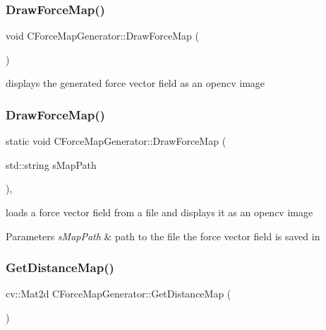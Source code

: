 \subsubsection{\texorpdfstring{Draw\+Force\+Map()}{DrawForceMap()}\hspace{0.1cm}{\footnotesize\ttfamily [1/2]}}
{\footnotesize\ttfamily void C\+Force\+Map\+Generator\+::\+Draw\+Force\+Map (\begin{DoxyParamCaption}{ }\end{DoxyParamCaption})\hspace{0.3cm}{\ttfamily [inline]}}

displays the generated force vector field as an opencv image \mbox{\label{classCForceMapGenerator_ab05430eb97cf83da00b1116877a37c36}} 
\subsubsection{\texorpdfstring{Draw\+Force\+Map()}{DrawForceMap()}\hspace{0.1cm}{\footnotesize\ttfamily [2/2]}}
{\footnotesize\ttfamily static void C\+Force\+Map\+Generator\+::\+Draw\+Force\+Map (\begin{DoxyParamCaption}\item[{std\+::string}]{s\+Map\+Path }\end{DoxyParamCaption})\hspace{0.3cm}{\ttfamily [inline]}, {\ttfamily [static]}}

loads a force vector field from a file and displays it as an opencv image 
\begin{DoxyParams}{Parameters}
{\em s\+Map\+Path} & path to the file the force vector field is saved in \\
\hline
\end{DoxyParams}
\mbox{\label{classCForceMapGenerator_afdd89858af3158b17170960df126a7df}} 
\subsubsection{\texorpdfstring{Get\+Distance\+Map()}{GetDistanceMap()}}
{\footnotesize\ttfamily cv\+::\+Mat2d C\+Force\+Map\+Generator\+::\+Get\+Distance\+Map (\begin{DoxyParamCaption}{ }\end{DoxyParamCaption})\hspace{0.3cm}{\ttfamily [inline]}}

